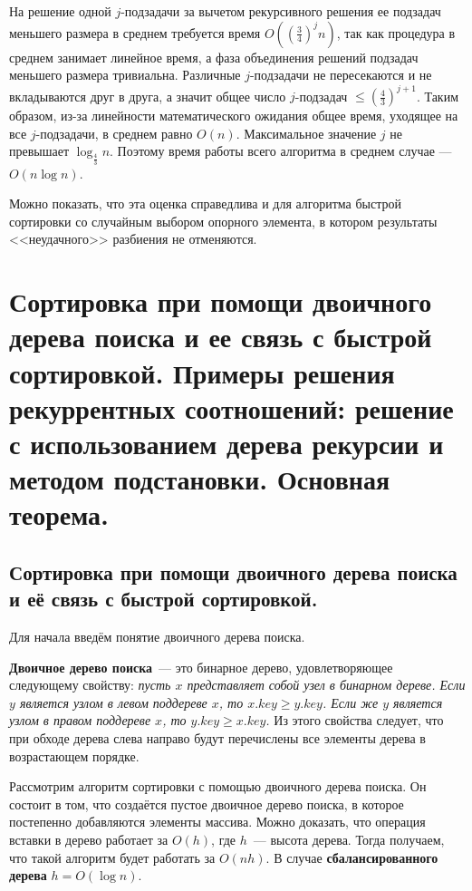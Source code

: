 \documentclass[a4paper,12pt]{article}
\begin{document}
На решение одной $j$-подзадачи за вычетом рекурсивного решения ее подзадач меньшего размера в среднем требуется время $O\left(\left(\frac{3}{4}\right)^jn\right)$, так как процедура  в среднем занимает линейное время, а фаза объединения решений подзадач меньшего размера тривиальна. Различные $j$-подзадачи не пересекаются и не вкладываются друг в друга, а значит общее число $j$-подзадач $\le \left(\frac{4}{3}\right)^{j+1}$. Таким образом, из-за линейности математического ожидания общее время, уходящее на все $j$-подзадачи, в среднем равно $O(n)$. Максимальное значение $j$ не превышает $\log_{\frac{4}{3}}n$. Поэтому время работы всего алгоритма в среднем случае --- $O(n\log n)$.

Можно показать, что эта оценка справедлива и для алгоритма быстрой сортировки со случайным выбором опорного элемента, в котором результаты <<неудачного>> разбиения не отменяются.
\newpage

\section{Сортировка при помощи двоичного дерева поиска и ее связь с быстрой сортировкой. Примеры решения рекуррентных соотношений: решение с использованием дерева рекурсии и методом подстановки. Основная теорема.}

\subsection{Сортировка при помощи двоичного дерева поиска и её связь с быстрой сортировкой.}
Для начала введём понятие двоичного дерева поиска.

\textbf{Двоичное дерево поиска}~--- это бинарное дерево, удовлетворяющее следующему свойству: \emph{пусть $x$ представляет собой узел в бинарном дереве. Если $y$ является узлом в левом поддереве $x$, то $x.key \geqslant y.key$. Если же $y$ является узлом в правом поддереве $x$, то $y.key \geqslant x.key$.} Из этого свойства следует, что при обходе дерева слева направо будут перечислены все элементы дерева в возрастающем порядке.

Рассмотрим алгоритм сортировки с помощью двоичного дерева поиска. Он состоит в том, что создаётся пустое двоичное дерево поиска, в которое постепенно добавляются элементы массива. Можно доказать, что операция вставки в дерево работает за $O(h)$, где $h$~--- высота дерева. Тогда получаем, что такой алгоритм будет работать за $O(nh)$. В случае \textbf{сбалансированного дерева} $h = O(\log n)$. 
\end{document}
